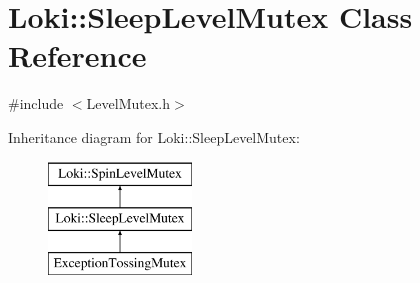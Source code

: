 \hypertarget{classLoki_1_1SleepLevelMutex}{}\section{Loki\+:\+:Sleep\+Level\+Mutex Class Reference}
\label{classLoki_1_1SleepLevelMutex}


{\ttfamily \#include $<$Level\+Mutex.\+h$>$}

Inheritance diagram for Loki\+:\+:Sleep\+Level\+Mutex\+:\begin{figure}[H]
\begin{center}
\leavevmode
\includegraphics[height=3.000000cm]{classLoki_1_1SleepLevelMutex}
\end{center}
\end{figure}
